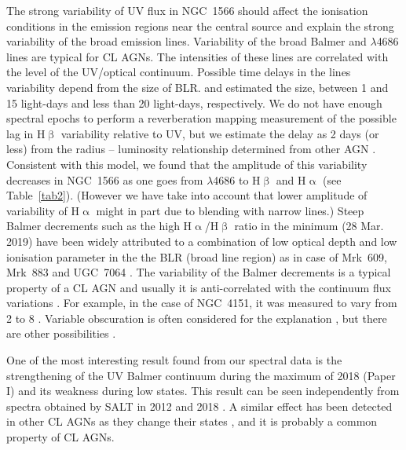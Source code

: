 \documentclass[fleqn,usenatbib]{mnras}
\begin{document}
The strong variability of UV flux in NGC~1566 should affect the ionisation conditions in the emission regions near the central source and explain the strong variability of the broad emission lines. Variability of the broad Balmer and  $\lambda$4686 lines are typical for CL AGNs. The intensities of these lines are correlated with the level of the UV/optical continuum.  
Possible time delays in the lines variability depend from the size of BLR. \cite{Alloin1985} and \cite{Silva2017} estimated the size, between 1 and 15 light-days and less than 20 light-days, respectively. We do not have enough spectral epochs to perform a reverberation mapping measurement of the possible lag in H$\upbeta$ variability relative to UV, but we estimate the delay as 2 days (or less) from the radius -- luminosity relationship determined from other AGN \citep[see e.g.,][]{Shappee2014}. Consistent with this model, we found that the amplitude of this variability decreases in NGC~1566 as one goes from $\lambda$4686 to H$\upbeta$ and H$\upalpha$ (see Table~\ref{tab2}). (However we have take into account that lower amplitude of variability of H$\upalpha$ might in part due to blending with narrow  lines.) Steep Balmer decrements such as the high H$\upalpha$/H$\upbeta$ ratio in the minimum (28 Mar. 2019) have been widely attributed to a combination of low optical depth and low ionisation parameter in the the BLR (broad line region) as  in case of Mrk~609, Mrk~883 and UGC~7064 \citep{Goodrich1995, Rudy1988}. The variability of the Balmer decrements is a typical property of a CL AGN and usually it is anti-correlated with the continuum flux variations \citep{Shapovalova2004}. For example, in the case of NGC~4151, it was measured to vary from 2 to 8 \citep{Shapovalova2008}. Variable obscuration is often considered for the explanation \citep[see e.g,][]{Gaskell17}, but there are other possibilities \citep[see e.g.,][]{Ilich2012}. 

One of the most interesting result found from our spectral data is the strengthening of the UV Balmer continuum  during the maximum of 2018 (Paper I) and its weakness during low states. This result can be seen independently from spectra obtained by SALT in 2012 and 2018 \citep{Kollatschny2020}. A similar effect has been detected in other CL AGNs as they change their states \citep[see e.g., ][]{Shappee2014, Edelson2000}, and it is probably a common property of CL AGNs.
\end{document}
